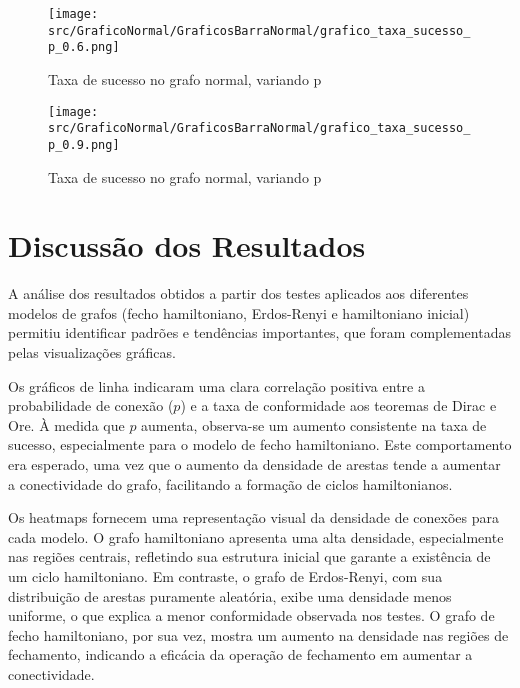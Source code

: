 \documentclass[12pt, openright, oneside, a4paper, chapter=TITLE, section=TITLE, subsection=TITLE, subsubsection=TITLE, brazil]{abntex2}
\begin{document}
\begin{figure}[h]
    \centering
    \begin{minipage}{0.45\textwidth}
        \centering
        \texttt{[image: src/GraficoNormal/GraficosBarraNormal/grafico\_taxa\_sucesso\_p\_0.6.png]}
        \caption{Taxa de sucesso no grafo normal, variando p}
        \label{fig:Taxa de sucesso no grafo normal, variando p.6}
    \end{minipage}
    \hfill
    \begin{minipage}{0.45\textwidth}
        \centering
        \texttt{[image: src/GraficoNormal/GraficosBarraNormal/grafico\_taxa\_sucesso\_p\_0.9.png]}
        \caption{Taxa de sucesso no grafo normal, variando p}
        \label{fig:Taxa de sucesso no grafo normal, variando p.9}
    \end{minipage}
\end{figure}

\clearpage
\section{Discussão dos Resultados}
\hspace{1.25cm}A análise dos resultados obtidos a partir dos testes aplicados aos diferentes modelos de grafos (fecho hamiltoniano, Erdos-Renyi e hamiltoniano inicial) permitiu identificar padrões e tendências importantes, que foram complementadas pelas visualizações gráficas.

Os gráficos de linha indicaram uma clara correlação positiva entre a probabilidade de conexão (\( p \)) e a taxa de conformidade aos teoremas de Dirac e Ore. À medida que \( p \) aumenta, observa-se um aumento consistente na taxa de sucesso, especialmente para o modelo de fecho hamiltoniano. Este comportamento era esperado, uma vez que o aumento da densidade de arestas tende a aumentar a conectividade do grafo, facilitando a formação de ciclos hamiltonianos.

Os heatmaps fornecem uma representação visual da densidade de conexões para cada modelo. O grafo hamiltoniano apresenta uma alta densidade, especialmente nas regiões centrais, refletindo sua estrutura inicial que garante a existência de um ciclo hamiltoniano. Em contraste, o grafo de Erdos-Renyi, com sua distribuição de arestas puramente aleatória, exibe uma densidade menos uniforme, o que explica a menor conformidade observada nos testes. O grafo de fecho hamiltoniano, por sua vez, mostra um aumento na densidade nas regiões de fechamento, indicando a eficácia da operação de fechamento em aumentar a conectividade.
\end{document}
